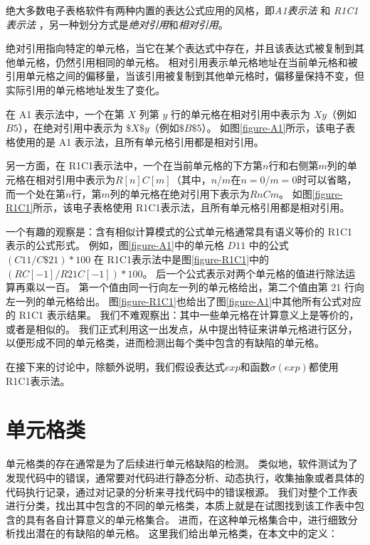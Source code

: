 \begin{definition}
    绝大多数电子表格软件有两种内置的表达公式应用的风格，即\textit{A1表示法} 和 \textit{R1C1表示法} \cite{tan2014bug} ，另一种划分方式是\textit{绝对引用}和\textit{相对引用}。
\end{definition}

绝对引用指向特定的单元格，当它在某个表达式中存在，并且该表达式被复制到其他单元格，仍然引用相同的单元格。
相对引用表示单元格地址在当前单元格和被引用单元格之间的偏移量，当该引用被复制到其他单元格时，偏移量保持不变，但实际引用的单元格地址发生了变化。

在 A1 表示法中，一个在第 $X$ 列第 $y$ 行的单元格在相对引用中表示为 $Xy$（例如$B5$），在绝对引用中表示为 $\$X\$y$（例如$\$B\$5$）。
如图\ref{figure-A1}所示，该电子表格使用的是 A1 表示法，且所有单元格引用都是相对引用。

另一方面，在 R1C1表示法中，一个在当前单元格的下方第$n$行和右侧第$m$列的单元格在相对引用中表示为$R[n]C[m]$（其中，$n$/$m$在$n=0$/$m=0$时可以省略，而一个处在第$n$行，第$m$列的单元格在绝对引用下表示为$RnCm$。
如图\ref{figure-R1C1}所示，该电子表格使用 R1C1表示法，且所有单元格引用都是相对引用。

一个有趣的观察是：含有相似计算模式的公式单元格通常具有语义等价的 R1C1 表示的公式形式。
例如，图\ref{figure-A1}中的单元格 $D11$ 中的公式$(C11/C\$21)*100$ 在 R1C1表示法中是图\ref{figure-R1C1}中的$(RC[-1]/R21C[-1])*100$。
后一个公式表示对两个单元格的值进行除法运算再乘以一百。
第一个值由同一行向左一列的单元格给出，第二个值由第 21 行向左一列的单元格给出。
图\ref{figure-R1C1}也给出了图\ref{figure-A1}中其他所有公式对应的 R1C1 表示结果。
我们不难观察出：其中一些单元格在计算意义上是等价的，或者是相似的。
我们正式利用这一出发点，从中提出特征来讲单元格进行区分，以便形成不同的单元格类，进而检测出每个类中包含的有缺陷的单元格。

在接下来的讨论中，除额外说明，我们假设表达式$exp$和函数$\sigma(exp)$都使用 R1C1表示法。

\section{单元格类}

单元格类的存在通常是为了后续进行单元格缺陷的检测。
类似地，软件测试为了发现代码中的错误，通常要对代码进行静态分析、动态执行，收集抽象或者具体的代码执行记录，通过对记录的分析来寻找代码中的错误根源。
我们对整个工作表进行分类，找出其中包含的不同的单元格类，本质上就是在试图找到该工作表中包含的具有各自计算意义的单元格集合。
进而，在这种单元格集合中，进行细致分析找出潜在的有缺陷的单元格。
这里我们给出单元格类，在本文中的定义：

